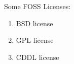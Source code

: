 \documentclass{article}
\begin{document}
Some FOSS Licenses:
\begin{enumerate}
\item BSD license
\item GPL license
\item CDDL license
\end{enumerate}
\end{document}

